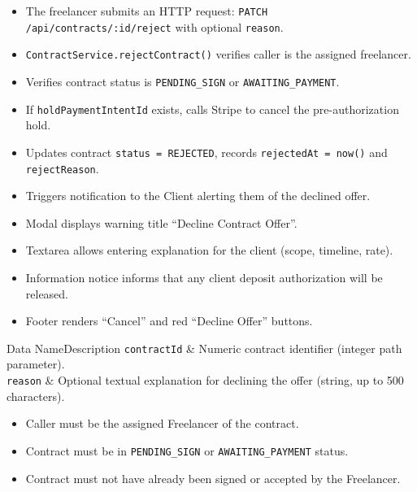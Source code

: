 \begin{itemize}[leftmargin=1.6em,topsep=3pt,itemsep=2pt,parsep=0pt,label=$\bullet$]
      \item The freelancer submits an HTTP request: \texttt{PATCH /api/contracts/:id/reject} with optional \texttt{reason}.
      \item \texttt{ContractService.rejectContract()} verifies caller is the assigned freelancer.
      \item Verifies contract status is \texttt{PENDING\_SIGN} or \texttt{AWAITING\_PAYMENT}.
      \item If \texttt{holdPaymentIntentId} exists, calls Stripe to cancel the pre-authorization hold.
      \item Updates contract \texttt{status = REJECTED}, records \texttt{rejectedAt = now()} and \texttt{rejectReason}.
      \item Triggers notification to the Client alerting them of the declined offer.
\end{itemize}

\begin{itemize}[leftmargin=1.6em,topsep=3pt,itemsep=2pt,parsep=0pt,label=$\bullet$]
      \item Modal displays warning title ``Decline Contract Offer''.
      \item Textarea allows entering explanation for the client (scope, timeline, rate).
      \item Information notice informs that any client deposit authorization will be released.
      \item Footer renders ``Cancel'' and red ``Decline Offer'' buttons.
\end{itemize}


\begin{specdatatable}{Data Name}{Description}
      \texttt{contractId} & Numeric contract identifier (integer path parameter).\\ \hline
      \texttt{reason} & Optional textual explanation for declining the offer (string, up to 500 characters).\\ \hline
\end{specdatatable}

\begin{itemize}[leftmargin=1.6em,topsep=3pt,itemsep=2pt,parsep=0pt,label=$\bullet$]
      \item Caller must be the assigned Freelancer of the contract.
      \item Contract must be in \texttt{PENDING\_SIGN} or \texttt{AWAITING\_PAYMENT} status.
      \item Contract must not have already been signed or accepted by the Freelancer.
\end{itemize}

